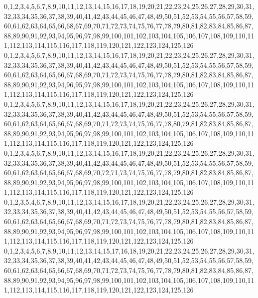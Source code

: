 \documentclass[12pt]{article}
\begin{document}
{0,1,2,3,4,5,6,7,8,9,10,11,12,13,14,15,16,17,18,19,20,21,22,23,24,25,26,27,28,29,30,31,32,33,34,35,36,37,38,39,40,41,42,43,44,45,46,47,48,49,50,51,52,53,54,55,56,57,58,59,60,61,62,63,64,65,66,68,67,69,70,71,72,73,74,75,76,77,78,79,80,81,82,83,84,85,86,87,88,89,90,91,92,93,94,95,96,97,98,99,100,101,102,103,104,105,106,107,108,109,110,111,112,113,114,115,116,117,118,119,120,121,122,123,124,125,126\\
0,1,2,3,4,5,6,7,8,9,10,11,12,13,14,15,16,17,18,19,20,21,22,23,24,25,26,27,28,29,30,31,32,33,34,35,36,37,38,39,40,41,42,43,44,45,46,47,48,49,50,51,52,53,54,55,56,57,58,59,60,61,62,63,64,65,66,67,68,69,70,71,72,73,74,75,76,77,78,79,80,81,82,83,84,85,86,87,88,89,90,91,92,93,94,96,95,97,98,99,100,101,102,103,104,105,106,107,108,109,110,111,112,113,114,115,116,117,118,119,120,121,122,123,124,125,126\\
0,1,2,3,4,5,6,7,8,9,10,11,12,13,14,15,16,17,18,19,20,21,22,23,24,25,26,27,28,29,30,31,32,33,34,35,36,37,38,39,40,41,42,43,44,45,46,47,48,49,50,51,52,53,54,55,56,57,58,59,60,61,62,63,64,65,66,67,68,69,70,71,72,73,74,75,76,77,78,80,79,81,82,83,84,85,86,87,88,89,90,91,92,93,94,95,96,97,98,99,100,101,102,103,104,105,106,107,108,109,110,111,112,113,114,115,116,117,118,119,120,121,122,123,124,125,126\\
0,1,2,3,4,5,6,7,8,9,10,11,12,13,14,15,16,17,18,19,20,21,22,23,24,25,26,27,28,29,30,31,32,33,34,35,36,37,38,39,40,41,42,43,44,45,46,47,48,49,50,51,52,53,54,55,56,57,58,59,60,61,62,63,64,65,66,67,68,69,70,72,71,73,74,75,76,77,78,79,80,81,82,83,84,85,86,87,88,89,90,91,92,93,94,95,96,97,98,99,100,101,102,103,104,105,106,107,108,109,110,111,112,113,114,115,116,117,118,119,120,121,122,123,124,125,126\\
0,1,2,3,5,4,6,7,8,9,10,11,12,13,14,15,16,17,18,19,20,21,22,23,24,25,26,27,28,29,30,31,32,33,34,35,36,37,38,39,40,41,42,43,44,45,46,47,48,49,50,51,52,53,54,55,56,57,58,59,60,61,62,63,64,65,66,67,68,69,70,71,72,73,74,75,76,77,78,79,80,81,82,83,84,85,86,87,88,89,90,91,92,93,94,95,96,97,98,99,100,101,102,103,104,105,106,107,108,109,110,111,112,113,114,115,116,117,118,119,120,121,122,123,124,125,126\\
0,1,2,3,4,5,6,7,8,9,10,11,12,13,14,15,17,16,18,19,20,21,22,23,24,25,26,27,28,29,30,31,32,33,34,35,36,37,38,39,40,41,42,43,44,45,46,47,48,49,50,51,52,53,54,55,56,57,58,59,60,61,62,63,64,65,66,67,68,69,70,71,72,73,74,75,76,77,78,79,80,81,82,83,84,85,86,87,88,89,90,91,92,93,94,95,96,97,98,99,100,101,102,103,104,105,106,107,108,109,110,111,112,113,114,115,116,117,118,119,120,121,122,123,124,125,126\\
}
\end{document}
